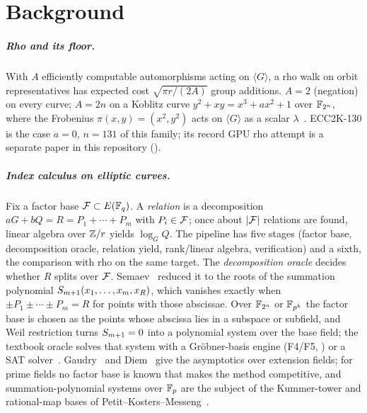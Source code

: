 \chapter{Background}\label{sec:background}

\paragraph{Rho and its floor.} With $A$ efficiently computable
automorphisms acting on $\langle G\rangle$, a rho walk on orbit
representatives has expected cost $\sqrt{\pi r/(2A)}$ group additions.
$A=2$ (negation) on every curve; $A=2n$ on a Koblitz curve
$y^2+xy=x^3+ax^2+1$ over $\mathbb{F}_{2^n}$, where the Frobenius
$\pi(x,y)=(x^2,y^2)$ acts on $\langle G\rangle$ as a scalar
$\lambda$~\cite{wiener1998,gallant2000}. ECC2K-130 is the case $a=0$,
$n=131$ of this family; its record GPU rho attempt is a separate paper in
this repository ().

\paragraph{Index calculus on elliptic curves.} Fix a factor base
$\mathcal{F}\subset E(\mathbb{F}_q)$. A \emph{relation} is a decomposition
$aG+bQ=R=P_1+\cdots+P_m$ with $P_i\in\mathcal{F}$; once about $\lvert \mathcal{F} \rvert$ relations
are found, linear algebra over $\mathbb{Z}/r$ yields $\log_G Q$. The pipeline has
five stages (factor base, decomposition oracle, relation yield, rank/linear
algebra, verification) and a sixth, the comparison with rho on the same
target. The \emph{decomposition oracle} decides whether $R$ splits over
$\mathcal{F}$. Semaev~\cite{semaev2004} reduced it to the roots of the summation
polynomial $S_{m+1}(x_1,\ldots,x_m,x_R)$, which vanishes exactly when
$\pm P_1\pm\cdots\pm P_m=R$ for points with those abscissae. Over
$\mathbb{F}_{2^n}$ or $\mathbb{F}_{p^k}$ the factor base is chosen as the points whose
abscissa lies in a subspace or subfield, and Weil restriction turns
$S_{m+1}=0$ into a polynomial system over the base field; the textbook
oracle solves that system with a Gr\"obner-basis engine (F4/F5,
\cite{faugere1999,faugere2002}) or a SAT solver~\cite{trimoska2020}.
Gaudry~\cite{gaudry2009} and Diem~\cite{diem2011} give the asymptotics
over extension fields; for prime fields no factor base is known that makes
the method competitive, and summation-polynomial systems over $\mathbb{F}_p$ are
the subject of the Kummer-tower and rational-map bases of
Petit--Kosters--Messeng~\cite{pkm2016}.

